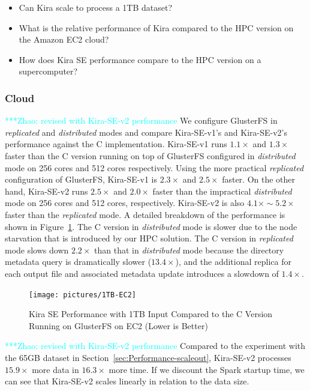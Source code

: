 \documentclass[10pt,journal,compsoc]{IEEEtran}
\newcommand{\zhaonote}[1]{{\textcolor{cyan}    { ***Zhao:      #1 }}}
\newcommand{\zhaonote}[1]{}
\begin{document}
\begin{itemize}
\item Can Kira scale to process a 1TB dataset?
\item What is the relative performance of Kira compared to the HPC version on the Amazon EC2 cloud?
\item How does Kira SE performance compare to the HPC version on a supercomputer?
\end{itemize}

\subsubsection{Cloud}
\label{sec:1TB-EC2}
\zhaonote{revised with Kira-SE-v2 performance}
We configure GlusterFS in \emph{replicated} and \emph{distributed} modes and compare 
Kira-SE-v1's and Kira-SE-v2's performance against the C implementation. 
Kira-SE-v1 runs $1.1\times$ and $1.3\times$ faster than the C version running on top of
GlusterFS configured in \emph{distributed} mode on 256 cores and 512 cores respectively. 
Using the more practical \emph{replicated} configuration of GlusterFS, Kira-SE-v1 is $2.3\times$ and $2.5\times$ faster. 
On the other hand, Kira-SE-v2 runs $2.5\times$ and $2.0\times$ faster than the impractical \emph{distributed} mode on 256 cores and 512 cores, respectively.
Kira-SE-v2 is also $4.1\times\sim5.2\times$ faster than the \emph{replicated} mode.
A detailed breakdown of the performance is shown in Figure~\ref{fig:1tb-ec2}.
The C version in \emph{distributed} mode is slower due to the node starvation that is introduced by our HPC solution.
The C version in \emph{replicated} mode slows down $2.2\times$ than that in \emph{distributed} mode because the directory metadata query
is dramatically slower ($13.4\times$), and the additional replica for each output file and associated metadata update introduces a slowdown
of $1.4\times$.

\begin{figure}[t]
	\begin{center}
		\texttt{[image: pictures/1TB-EC2]}
		\caption{Kira SE Performance with 1TB Input Compared to the C Version Running on GlusterFS on EC2 (Lower is Better)
		\label{fig:1tb-ec2}}
  	\end{center}
\end{figure}

\zhaonote{revised with Kira-SE-v2 performance}
Compared to the experiment with the 65GB dataset in Section~\ref{sec:Performance-scaleout},
Kira-SE-v2 processes $15.9\times$ more data in $16.3\times$ more time. If we discount the Spark
startup time, we can see that Kira-SE-v2 scales linearly in relation to the data size.
\end{document}
